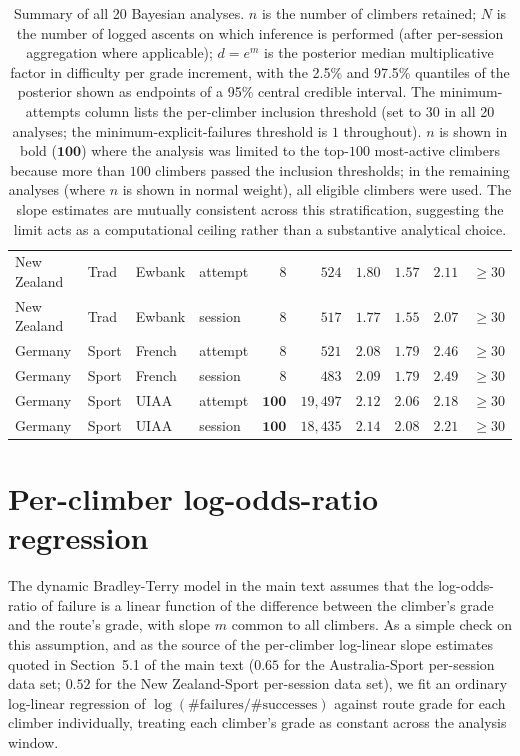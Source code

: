 \documentclass[11pt]{article}
\begin{document}
{\begin{landscape}
\begin{table}[ht]
\begin{tabular}{llllrrrrrr}
      New Zealand & Trad       & Ewbank  & attempt & $8$   & $524$      & $1.80$ & $1.57$ & $2.11$ & $\geq 30$ \\
      New Zealand & Trad       & Ewbank  & session & $8$   & $517$      & $1.77$ & $1.55$ & $2.07$ & $\geq 30$ \\
      \midrule
      Germany     & Sport      & French  & attempt & $8$   & $521$      & $2.08$ & $1.79$ & $2.46$ & $\geq 30$ \\
      Germany     & Sport      & French  & session & $8$   & $483$      & $2.09$ & $1.79$ & $2.49$ & $\geq 30$ \\
      Germany     & Sport      & UIAA    & attempt & $\mathbf{100}$ & $19{,}497$ & $2.12$ & $2.06$ & $2.18$ & $\geq 30$ \\
      Germany     & Sport      & UIAA    & session & $\mathbf{100}$ & $18{,}435$ & $2.14$ & $2.08$ & $2.21$ & $\geq 30$ \\
      \bottomrule
    \end{tabular}
    \caption{Summary of all 20 Bayesian analyses. $n$ is the number of climbers retained; $N$ is the number of logged ascents on which inference is performed (after per-session aggregation where applicable); $d = e^m$ is the posterior median multiplicative factor in difficulty per grade increment, with the 2.5\% and 97.5\% quantiles of the posterior shown as endpoints of a 95\% central credible interval. The minimum-attempts column lists the per-climber inclusion threshold (set to $30$ in all 20 analyses; the minimum-explicit-failures threshold is $1$ throughout). $n$ is shown in bold ($\mathbf{100}$) where the analysis was limited to the top-$100$ most-active climbers because more than $100$ climbers passed the inclusion thresholds; in the remaining analyses (where $n$ is shown in normal weight), all eligible climbers were used. The slope estimates are mutually consistent across this stratification, suggesting the limit acts as a computational ceiling rather than a substantive analytical choice.}
    \label{si:datasets}
    \end{table}
    \end{landscape}
    \clearpage
}


\section{Per-climber log-odds-ratio regression}
\label{si:regression}

The dynamic Bradley-Terry model in the main text assumes that the log-odds-ratio of failure is a linear function of the difference between the climber's grade and the route's grade, with slope $m$ common to all climbers. As a simple check on this assumption, and as the source of the per-climber log-linear slope estimates quoted in Section~5.1 of the main text ($0.65$ for the Australia-Sport per-session data set; $0.52$ for the New Zealand-Sport per-session data set), we fit an ordinary log-linear regression of $\log(\#\text{failures}/\#\text{successes})$ against route grade for each climber individually, treating each climber's grade as constant across the analysis window.
\end{document}
